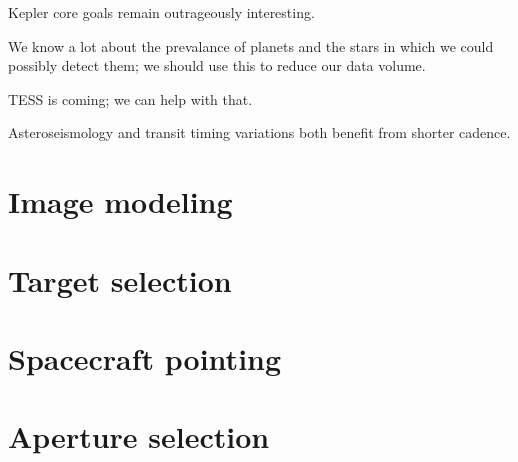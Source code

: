 \documentclass[12pt]{article}
\begin{document}
Kepler core goals remain outrageously interesting.

We know a lot about the prevalance of planets and the stars in which
we could possibly detect them; we should use this to reduce our data
volume.

TESS is coming; we can help with that.

Asteroseismology and transit timing variations both benefit from
shorter cadence.

\section{Image modeling}

\section{Target selection}

\section{Spacecraft pointing}

\section{Aperture selection}
\end{document}
